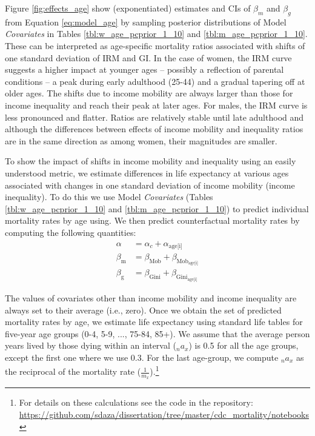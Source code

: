 \documentclass[11pt]{article}
\begin{document}
Figure \ref{fig:effects_age} show (exponentiated) estimates and CIs of $\beta_{m}$ and $\beta_{g}$ from Equation \ref{eq:model_age} by sampling posterior distributions of Model \textit{Covariates} in Tables \ref{tbl:w_age_pcprior_1_10} and \ref{tbl:m_age_pcprior_1_10}. These can be interpreted as age-specific mortality ratios associated with shifts of one standard deviation of IRM and GI. In the case of women, the IRM curve suggests a higher impact at younger ages -- possibly a reflection of parental conditions -- a peak during early adulthood (25-44) and a gradual tapering off at older ages. The shifts due to income mobility are always larger than those for income inequality and reach their peak at later ages. For males, the IRM  curve is less pronounced and flatter. Ratios are relatively stable until late adulthood and although the differences between effects of income mobility and inequality ratios are in the same direction as among women, their magnitudes are smaller.

To show the impact of shifts in income mobility and inequality using an easily understood metric, we estimate differences in life expectancy at various ages associated with changes in one standard deviation of income mobility (income inequality). To do this we use  Model \textit{Covariates} (Tables \ref{tbl:w_age_pcprior_1_10} and \ref{tbl:m_age_pcprior_1_10}) to predict individual mortality rates by age using. We then predict counterfactual mortality rates by computing the following quantities: 
\begin{align}
    \alpha & =  \alpha_c  + \alpha_{\text{age[i]}} \nonumber  \\ 
  \beta_{\text{m}}  & = \beta_{\text{Mob}} + 
  \beta_{\text{Mob}_{\text{age[i]}}} \nonumber  \\ 
   \beta_{\text{g}}  & = \beta_{\text{Gini}} + \beta_{\text{Gini}_{\text{age[i]}}} \label{eq:le_age}
\end{align}

The values of covariates other than income mobility and income inequality are always set to their average (i.e., zero). Once we obtain the set of  predicted mortality rates by age, we estimate life expectancy using standard life tables for five-year age groups (0-4, 5-9, ..., 75-84, 85+). We assume that the average person years lived by those dying within an interval ($_na_x$) is 0.5 for all the age groups, except the first one where we use 0.3. For the last age-group, we compute $_na_x$ as the reciprocal of the mortality rate ($\frac{1}{m_x}$).\footnote{For details on these calculations see the code in the repository: \url{https://github.com/sdaza/dissertation/tree/master/cdc_mortality/notebooks}} 
\end{document}
